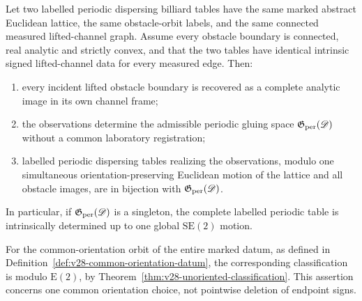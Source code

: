 \begin{theorem}
\label{thm:v23-intrinsic-table-rigidity}
Let two labelled periodic dispersing billiard tables have the same marked
abstract Euclidean lattice, the same obstacle-orbit labels, and the same
connected measured lifted-channel graph.  Assume every obstacle boundary is
connected, real analytic and strictly convex, and that the two tables have
identical intrinsic signed lifted-channel data for every measured edge.  Then:
\begin{enumerate}
\item every incident lifted obstacle boundary is recovered as a complete
analytic image in its own channel frame;
\item the observations determine the admissible periodic gluing space
\(\mathfrak G_{\rm per}(\mathscr D)\) without a common laboratory registration;
\item labelled periodic dispersing tables realizing the observations, modulo
one simultaneous orientation-preserving Euclidean motion of the lattice and
all obstacle images, are in bijection with
\(\mathfrak G_{\rm per}(\mathscr D)\).
\end{enumerate}
In particular, if \(\mathfrak G_{\rm per}(\mathscr D)\) is a singleton, the
complete labelled periodic table is intrinsically determined up to one global
\(\mathrm{SE}(2)\) motion.

For the common-orientation orbit of the entire marked datum, as defined in
Definition~\ref{def:v28-common-orientation-datum}, the corresponding
classification is modulo \(\mathrm E(2)\), by
Theorem~\ref{thm:v28-unoriented-classification}.  This assertion concerns one
common orientation choice, not pointwise deletion of endpoint signs.
\end{theorem}

